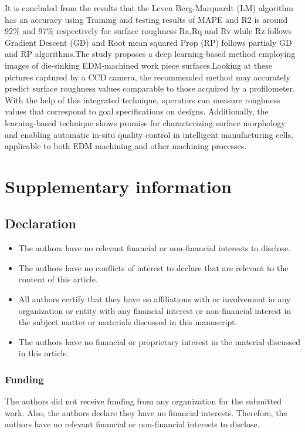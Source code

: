 \documentclass[suppldata]{interact}
\begin{document}
It is concluded from the results that the Leven Berg-Marquardt (LM) algorithm  has an accuracy using Training and testing results of MAPE and R$2$ is around 92\% and 97\% respectively for surface roughness  Ra,Rq and Rv while Rz follows Gradient Descent (GD)  and Root mean squared Prop (RP) follows partialy GD and RP algorithms.The study proposes a deep learning-based method employing images of die-sinking EDM-machined work piece surfaces.Looking at these pictures captured by a CCD  camera, the recommended method may accurately predict surface roughness values comparable to those acquired by a profilometer. With the help of this integrated technique, operators can measure roughness values that correspond to goal specifications on designs. Additionally, the learning-based technique shows promise for characterizing surface morphology and enabling automatic in-situ quality control in intelligent manufacturing cells, applicable to both EDM machining and other machining processes.


 

\section{ Supplementary information}
\subsection{Declaration}
\begin{itemize}
\item The authors have no relevant financial or non-financial interests to disclose.
\item The authors have no conflicts of interest to declare that are relevant to the content of this article.
\item All authors certify that they have no affiliations with or involvement in any organization or entity with any financial interest or non-financial interest in the subject matter or materials discussed in this manuscript.
\item The authors have no financial or proprietary interest in the material discussed in this article.
\end{itemize}
\subsubsection {Funding}
The authors did not receive funding from any organization for the submitted work. Also, the authors declare they have no financial interests. Therefore, the authors have no relevant financial or non-financial interests to disclose.
\end{document}
